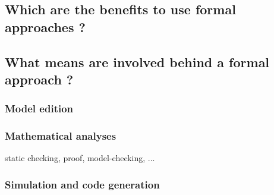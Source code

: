 


\begin{comment}
No requirement on the way of doing this. \emph{E.g.} to have a certified 
(certifiable?) code generator, two generators and comparison of the result, one
 generation and one verification chain\dots
 \end{comment}
 
\subsection{Which are the benefits to use formal approaches ? }


\begin{comment}
From D.2.5 :

The purpose of the formalization is:
\begin{itemize}
\item to enhance the understanding of modelled subset;
\item to allow formal analysis of the modelled subset;
\item to be able to animate the model for testing an analyzing purpose;
\item to provide information on the completeness and soundness of the SUBSET-26;
\item to be used as a reference formal specification for the implementation of an OBU 
(by the OpenETCS project team and by industrial actors);
\item \dots
\end{itemize}
\end{comment}

\subsection{What means are involved behind a formal approach ?}

\subsubsection{Model edition}

\subsubsection{Mathematical analyses}
static checking, proof, model-checking, ...

\subsubsection{Simulation and code generation}


